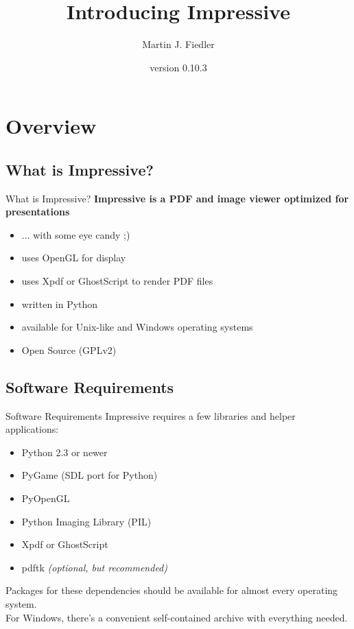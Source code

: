 \documentclass[bigger,hyperref={colorlinks=true,linkcolor=white,urlcolor=blue}]{beamer}
\title{Introducing Impressive}
\author{Martin J. Fiedler}
\date{version 0.10.3}
\begin{document}
\maketitle


\section{Overview}

\subsection{What is Impressive?}
\begin{frame}{What is Impressive?}
    \large
    \textbf{Impressive is a PDF and image viewer optimized for presentations}
    \normalsize
    \begin{itemize}
        \item ... with some eye candy ;)
        \item uses OpenGL for display
        \item uses Xpdf or GhostScript to render PDF files
        \item written in Python
        \item available for Unix-like and Windows operating systems
        \item Open Source (GPLv2)
    \end{itemize}
\end{frame}

\subsection{Software Requirements}
\begin{frame}{Software Requirements}
    Impressive requires a few libraries and helper applications:
    \begin{itemize}
        \item Python 2.3 or newer
        \item PyGame (SDL port for Python)
        \item PyOpenGL
        \item Python Imaging Library (PIL)
        \item Xpdf or GhostScript
        \item pdftk \emph{(optional, but recommended)}
    \end{itemize}
    Packages for these dependencies should be available for almost every
    operating system. \\
    For Windows, there's a convenient self-contained archive with
    everything needed.
\end{frame}
\end{document}
